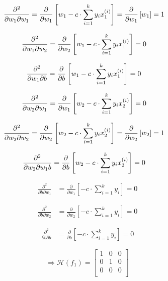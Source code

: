 \documentclass[12pt,landscape]{article}
\begin{document}
\begin{align}
\frac{\partial^2}{\partial w_1 \partial w_1} &=  \frac{\partial}{\partial w_1} \left[  w_1 - c \cdot \sum\limits_{i=1}^k y_i x_1^{(i)} \right]  = \frac{\partial}{\partial w_1} \left[ w_1 \right] = 1
\end{align}

\begin{align}
\frac{\partial^2}{\partial w_1 \partial w_2} &=  \frac{\partial}{\partial w_2} \left[  w_1 - c \cdot \sum\limits_{i=1}^k y_i x_1^{(i)} \right] =  0
\end{align}

\begin{align}
\frac{\partial^2}{\partial w_1 \partial b} &=  \frac{\partial}{\partial b} \left[  w_1 - c \cdot \sum\limits_{i=1}^k y_i x_1^{(i)} \right] = 0
\end{align}

\begin{align}
\frac{\partial^2}{\partial w_2 \partial w_1} &=  \frac{\partial}{\partial w_1} \left[ w_2 - c \cdot \sum\limits_{i=1}^k y_i x_2^{(i)} \right] = 0
\end{align}

\begin{align}
\frac{\partial^2}{\partial w_2 \partial w_2} &= \frac{\partial}{\partial w_2} \left[ w_2 - c \cdot \sum\limits_{i=1}^k y_i x_2^{(i)} \right] = \frac{\partial}{\partial w_2} \left[ w_2 \right] = 1
\end{align}

\begin{align}
\frac{\partial^2}{\partial w_2 \partial w_1 b} &= \frac{\partial}{\partial b} \left[ w_2 - c \cdot \sum\limits_{i=1}^k y_i x_2^{(i)} \right] = 0
\end{align}

\begin{align}
\frac{\partial^2}{\partial b \partial w_1} &= \frac{\partial}{\partial w_1} \left[  - c \cdot \sum\limits_{i=1}^k y_i \right] = 0
\end{align}

\begin{align}
\frac{\partial^2}{\partial b \partial w_2}  &= \frac{\partial}{\partial w_2} \left[  - c \cdot \sum\limits_{i=1}^k y_i \right] = 0
\end{align}

\begin{align}
\frac{\partial^2}{\partial b \partial b} &= \frac{\partial}{\partial b} \left[  - c \cdot \sum\limits_{i=1}^k y_i \right] = 0
\end{align}


\begin{equation}
\Rightarrow \mathcal{H}(f_1) = \begin{bmatrix}
1 & 0 & 0\\
0 & 1 & 0\\
0&0&0\\
\end{bmatrix}
\end{equation}
\end{document}
